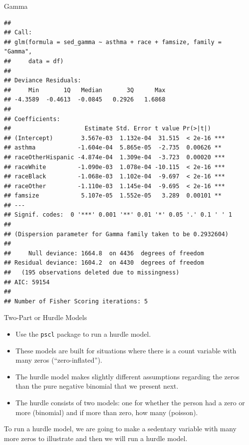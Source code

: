 \begin{frame}[fragile]{Gamma}

\small

\begin{verbatim}
## 
## Call:
## glm(formula = sed_gamma ~ asthma + race + famsize, family = "Gamma", 
##     data = df)
## 
## Deviance Residuals: 
##     Min       1Q   Median       3Q      Max  
## -4.3589  -0.4613  -0.0845   0.2926   1.6868  
## 
## Coefficients:
##                     Estimate Std. Error t value Pr(>|t|)    
## (Intercept)        3.567e-03  1.132e-04  31.515  < 2e-16 ***
## asthma            -1.604e-04  5.865e-05  -2.735  0.00626 ** 
## raceOtherHispanic -4.874e-04  1.309e-04  -3.723  0.00020 ***
## raceWhite         -1.090e-03  1.078e-04 -10.115  < 2e-16 ***
## raceBlack         -1.068e-03  1.102e-04  -9.697  < 2e-16 ***
## raceOther         -1.110e-03  1.145e-04  -9.695  < 2e-16 ***
## famsize            5.107e-05  1.552e-05   3.289  0.00101 ** 
## ---
## Signif. codes:  0 '***' 0.001 '**' 0.01 '*' 0.05 '.' 0.1 ' ' 1
## 
## (Dispersion parameter for Gamma family taken to be 0.2932604)
## 
##     Null deviance: 1664.8  on 4436  degrees of freedom
## Residual deviance: 1604.2  on 4430  degrees of freedom
##   (195 observations deleted due to missingness)
## AIC: 59154
## 
## Number of Fisher Scoring iterations: 5
\end{verbatim}

\Large

\end{frame}

\begin{frame}[fragile]{Two-Part or Hurdle Models}

\large

\begin{itemize}
\tightlist
\item
  Use the \texttt{pscl} package to run a hurdle model.
\item
  These models are built for situations where there is a count variable
  with many zeros (``zero-inflated'').
\item
  The hurdle model makes slightly different assumptions regarding the
  zeros than the pure negative binomial that we present next.
\item
  The hurdle consists of two models: one for whether the person had a
  zero or more (binomial) and if more than zero, how many (poisson).
\end{itemize}

To run a hurdle model, we are going to make a sedentary variable with
many more zeros to illustrate and then we will run a hurdle model.

\end{frame}

